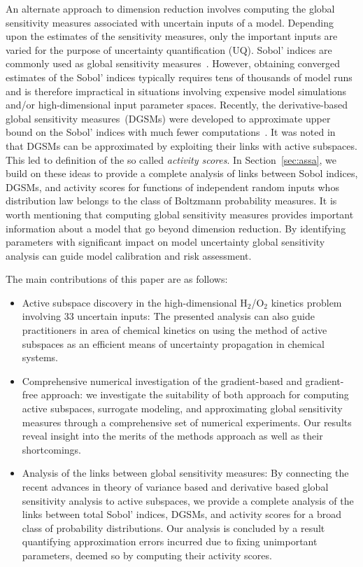 An alternate approach to dimension reduction involves computing the global
sensitivity measures associated with uncertain inputs of a model. Depending
upon the estimates of the sensitivity measures, only the important inputs are
varied for the purpose of uncertainty quantification (UQ). Sobol' indices are
commonly used as global sensitivity measures~\cite{Sobol:2001}. However,
obtaining converged estimates of the Sobol' indices typically requires tens of
thousands of model runs and is therefore impractical in situations involving
expensive model simulations and/or high-dimensional input parameter spaces.
Recently, the derivative-based global sensitivity measures~(DGSMs) were
developed to approximate upper bound on the Sobol' indices with much fewer
computations~\cite{Sobol:2009, Lamboni:2013}. It was noted
in~\cite{Diaz:2016,Constantine:2017} that DGSMs can be approximated by
exploiting their links with active subspaces. This led to definition of the so
called \emph{activity scores}. In Section~\ref{sec:assa}, we build on these
ideas to provide a complete analysis of links between Sobol indices, DGSMs, and
activity scores for functions of independent random inputs whos distribution
law belongs to the class of Boltzmann probability measures. 
It is worth mentioning that computing global sensitivity measures provides 
important information about a model that go beyond dimension reduction. By 
identifying parameters with significant impact on model uncertainty global 
sensitivity analysis can guide model calibration and risk assessment. 
 
The main contributions of this paper are as follows: 
\begin{itemize}
\item 
Active subspace
discovery in the high-dimensional H$_2$/O$_2$ kinetics problem involving 33
uncertain inputs:  The presented
analysis can also guide practitioners in area of chemical kinetics on using the
method of active subspaces as an efficient means of uncertainty propagation in
chemical systems.  
\item Comprehensive numerical investigation of the gradient-based and gradient-free approach: 
we investigate the suitability of both approach
for computing active subspaces, surrogate modeling, and approximating global
sensitivity measures through a comprehensive set of numerical experiments. Our
results reveal insight into the merits of the methods approach as well as
their shortcomings.  
\item Analysis of the links between  
global sensitivity measures: 
By connecting the recent advances in theory of variance based and
derivative based global sensitivity analysis to active subspaces, we provide a complete analysis
of the links between total Sobol' indices, DGSMs, and activity scores for a broad
class of probability distributions. Our analysis is concluded by a result quantifying
approximation errors incurred due to fixing unimportant parameters, deemed so by 
computing their activity scores.  

\end{itemize}

